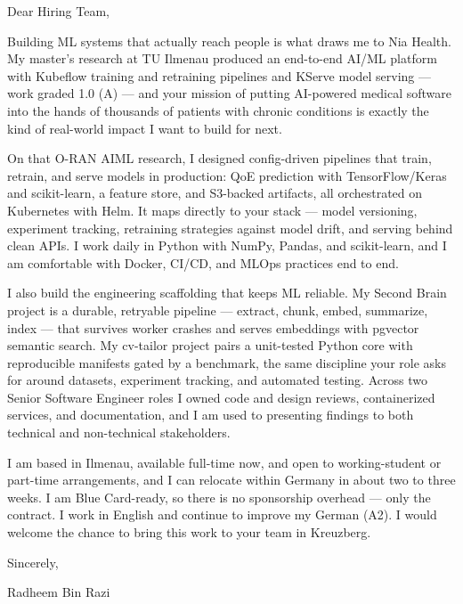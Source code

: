 \documentclass[11pt,a4paper]{coverletter}
\begin{document}

\opening{Dear Hiring Team,}

Building ML systems that actually reach people is what draws me to Nia Health. My master's research at TU Ilmenau produced an end-to-end AI/ML platform with Kubeflow training and retraining pipelines and KServe model serving — work graded 1.0 (A) — and your mission of putting AI-powered medical software into the hands of thousands of patients with chronic conditions is exactly the kind of real-world impact I want to build for next.

On that O-RAN AIML research, I designed config-driven pipelines that train, retrain, and serve models in production: QoE prediction with TensorFlow/Keras and scikit-learn, a feature store, and S3-backed artifacts, all orchestrated on Kubernetes with Helm. It maps directly to your stack — model versioning, experiment tracking, retraining strategies against model drift, and serving behind clean APIs. I work daily in Python with NumPy, Pandas, and scikit-learn, and I am comfortable with Docker, CI/CD, and MLOps practices end to end.

I also build the engineering scaffolding that keeps ML reliable. My Second Brain project is a durable, retryable pipeline — extract, chunk, embed, summarize, index — that survives worker crashes and serves embeddings with pgvector semantic search. My cv-tailor project pairs a unit-tested Python core with reproducible manifests gated by a benchmark, the same discipline your role asks for around datasets, experiment tracking, and automated testing. Across two Senior Software Engineer roles I owned code and design reviews, containerized services, and documentation, and I am used to presenting findings to both technical and non-technical stakeholders.

I am based in Ilmenau, available full-time now, and open to working-student or part-time arrangements, and I can relocate within Germany in about two to three weeks. I am Blue Card-ready, so there is no sponsorship overhead — only the contract. I work in English and continue to improve my German (A2). I would welcome the chance to bring this work to your team in Kreuzberg.

\closing{Sincerely,}{Radheem Bin Razi}

\clearpage
{}

\end{document}
